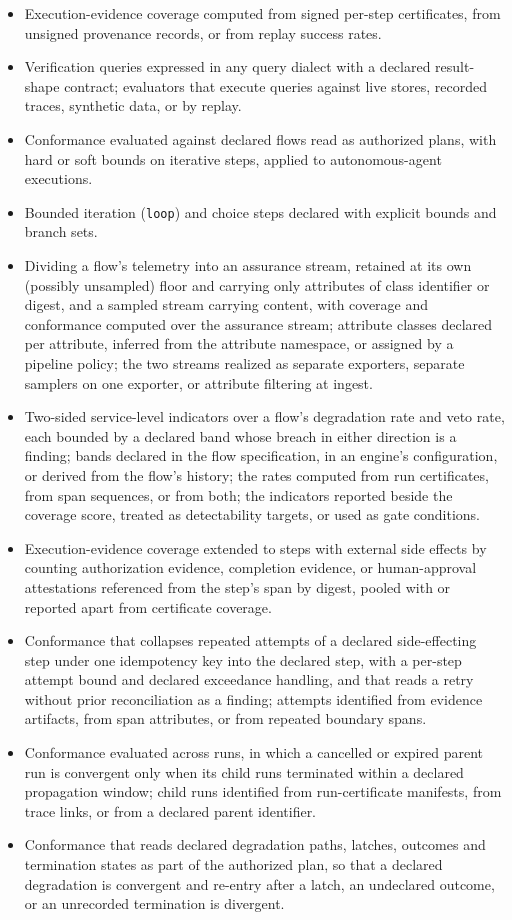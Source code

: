 \documentclass[11pt]{article}
\newcommand{\code}[1]{\texttt{#1}}
\begin{document}
\begin{itemize}
\item Execution-evidence coverage computed from signed per-step certificates, from unsigned provenance records, or from replay success rates.
\item Verification queries expressed in any query dialect with a declared result-shape contract; evaluators that execute queries against live stores, recorded traces, synthetic data, or by replay.
\item Conformance evaluated against declared flows read as authorized plans, with hard or soft bounds on iterative steps, applied to autonomous-agent executions.
\item Bounded iteration (\code{loop}) and choice steps declared with explicit bounds and branch sets.
\item Dividing a flow's telemetry into an assurance stream, retained at its own (possibly unsampled) floor and carrying only attributes of class identifier or digest, and a sampled stream carrying content, with coverage and conformance computed over the assurance stream; attribute classes declared per attribute, inferred from the attribute namespace, or assigned by a pipeline policy; the two streams realized as separate exporters, separate samplers on one exporter, or attribute filtering at ingest.
\item Two-sided service-level indicators over a flow's degradation rate and veto rate, each bounded by a declared band whose breach in either direction is a finding; bands declared in the flow specification, in an engine's configuration, or derived from the flow's history; the rates computed from run certificates, from span sequences, or from both; the indicators reported beside the coverage score, treated as detectability targets, or used as gate conditions.
\item Execution-evidence coverage extended to steps with external side effects by counting authorization evidence, completion evidence, or human-approval attestations referenced from the step's span by digest, pooled with or reported apart from certificate coverage.
\item Conformance that collapses repeated attempts of a declared side-effecting step under one idempotency key into the declared step, with a per-step attempt bound and declared exceedance handling, and that reads a retry without prior reconciliation as a finding; attempts identified from evidence artifacts, from span attributes, or from repeated boundary spans.
\item Conformance evaluated across runs, in which a cancelled or expired parent run is convergent only when its child runs terminated within a declared propagation window; child runs identified from run-certificate manifests, from trace links, or from a declared parent identifier.
\item Conformance that reads declared degradation paths, latches, outcomes and termination states as part of the authorized plan, so that a declared degradation is convergent and re-entry after a latch, an undeclared outcome, or an unrecorded termination is divergent.
\end{itemize}
\end{document}
